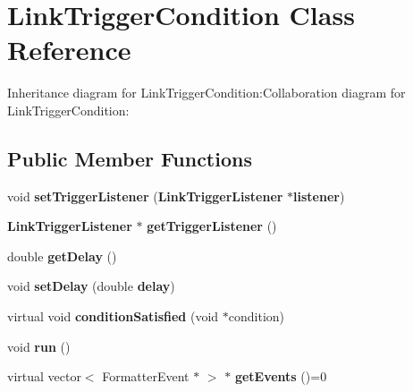 \section{LinkTriggerCondition Class Reference}
\label{classbr_1_1pucrio_1_1telemidia_1_1ginga_1_1ncl_1_1model_1_1link_1_1LinkTriggerCondition}
Inheritance diagram for LinkTriggerCondition:Collaboration diagram for LinkTriggerCondition:\subsection*{Public Member Functions}
\begin{CompactItemize}
\item 
void \textbf{setTriggerListener} ({\bf LinkTriggerListener} $\ast${\bf listener})\label{classbr_1_1pucrio_1_1telemidia_1_1ginga_1_1ncl_1_1model_1_1link_1_1LinkTriggerCondition_d67d877375d4db980964e8b98a12d21a}

\item 
{\bf LinkTriggerListener} $\ast$ \textbf{getTriggerListener} ()\label{classbr_1_1pucrio_1_1telemidia_1_1ginga_1_1ncl_1_1model_1_1link_1_1LinkTriggerCondition_2fad2bcf1bce129947087529ed03b835}

\item 
double \textbf{getDelay} ()\label{classbr_1_1pucrio_1_1telemidia_1_1ginga_1_1ncl_1_1model_1_1link_1_1LinkTriggerCondition_4d6a44d78bb009c8a3621fc0abf61018}

\item 
void \textbf{setDelay} (double {\bf delay})\label{classbr_1_1pucrio_1_1telemidia_1_1ginga_1_1ncl_1_1model_1_1link_1_1LinkTriggerCondition_63243e9a7b7e0276d88fef3453a6c554}

\item 
virtual void \textbf{conditionSatisfied} (void $\ast$condition)\label{classbr_1_1pucrio_1_1telemidia_1_1ginga_1_1ncl_1_1model_1_1link_1_1LinkTriggerCondition_63883076dacc0fb2604a1dda72b9b6c0}

\item 
void \textbf{run} ()\label{classbr_1_1pucrio_1_1telemidia_1_1ginga_1_1ncl_1_1model_1_1link_1_1LinkTriggerCondition_13a43e6d814de94978c515cb084873b1}

\item 
virtual vector$<$ FormatterEvent $\ast$ $>$ $\ast$ \textbf{getEvents} ()=0\label{classbr_1_1pucrio_1_1telemidia_1_1ginga_1_1ncl_1_1model_1_1link_1_1LinkTriggerCondition_8e62c6fde84172b6262fece11f155a89}

\end{CompactItemize}
